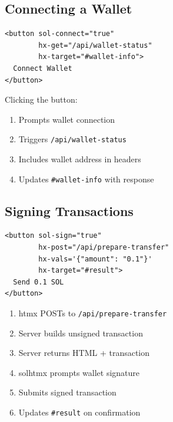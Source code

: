 \documentclass{article}
\begin{document}
\subsection{Connecting a Wallet}

\begin{verbatim}
<button sol-connect="true"
        hx-get="/api/wallet-status"
        hx-target="#wallet-info">
  Connect Wallet
</button>
\end{verbatim}

Clicking the button:

\begin{enumerate}
\item Prompts wallet connection

\item Triggers \texttt{/api/wallet-status}

\item Includes wallet address in headers

\item Updates \texttt{\#wallet-info} with response

\end{enumerate}

\subsection{Signing Transactions}

\begin{verbatim}
<button sol-sign="true"
        hx-post="/api/prepare-transfer"
        hx-vals='{"amount": "0.1"}'
        hx-target="#result">
  Send 0.1 SOL
</button>
\end{verbatim}

\begin{enumerate}
\item htmx POSTs to \texttt{/api/prepare-transfer}

\item Server builds unsigned transaction

\item Server returns HTML + transaction

\item solhtmx prompts wallet signature

\item Submits signed transaction

\item Updates \texttt{\#result} on confirmation

\end{enumerate}
\end{document}
